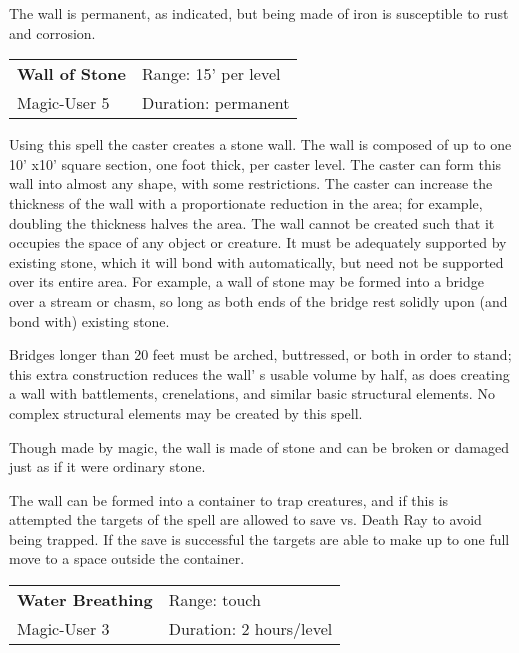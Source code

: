 \documentclass[a4paper,twoside,openany,10pt]{book}
\begin{document}
\begin{multicols}{2}
The wall is permanent, as indicated, but being made of iron is susceptible to rust and corrosion.

\smallskip\begin{flushleft} 
	\begin{tabularx}{0.45\textwidth}{@{}m{3.5cm}m{5.5cm}@{}} 
		\textbf{Wall of Stone} & Range: 15' per	level\\
		Magic-User 5 &Duration: permanent\\
	\end{tabularx}\end{flushleft}

Using this spell the caster creates a stone wall. The wall is composed of up to one 10' x10' square section, one foot thick, per caster level. The caster can form this wall into almost any shape, with some restrictions. The caster can increase the thickness of the wall with a proportionate reduction in the area; for example, doubling the thickness halves the area. The wall cannot be
created such that it occupies the space of any object or creature. It
must be adequately supported by existing stone, which it will bond with
automatically, but need not be supported over its entire area. For
example, a wall of stone may be formed into a bridge over a stream or
chasm, so long as both ends of the bridge rest solidly upon (and bond
with) existing stone.

Bridges longer than 20 feet must be arched, buttressed, or both in order
to stand; this extra construction reduces the wall' s
usable volume by half, as does creating a wall with battlements,
crenelations, and similar basic structural elements. No complex
structural elements may be created by this spell.

Though made by magic, the wall is made of stone and can be broken or
damaged just as if it were ordinary stone.

The wall can be formed into a container to trap creatures, and if this
is attempted the targets of the spell are allowed to save vs. Death Ray
to avoid being trapped. If the save is successful the targets are able
to make up to one full move to a space outside the container.

\smallskip\begin{flushleft} 
	\begin{tabularx}{0.45\textwidth}{@{}m{3.5cm}m{5.5cm}@{}} 
		\textbf{Water Breathing} & Range: touch\\
Magic-User 3 & Duration: 2 hours/level\\
	\end{tabularx}\end{flushleft}


\end{multicols}
\end{document}
